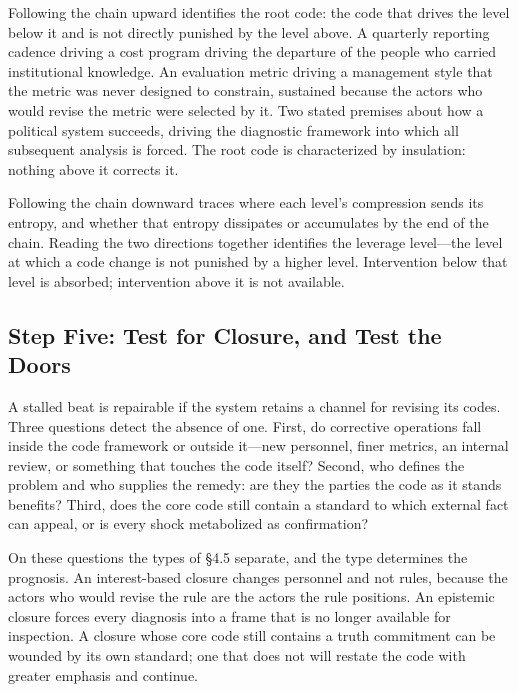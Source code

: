 \documentclass[11pt,a4paper]{article}
\begin{document}
Following the chain upward identifies the root code: the code that drives the level below it and is not directly punished by the level above. A quarterly reporting cadence driving a cost program driving the departure of the people who carried institutional knowledge. An evaluation metric driving a management style that the metric was never designed to constrain, sustained because the actors who would revise the metric were selected by it. Two stated premises about how a political system succeeds, driving the diagnostic framework into which all subsequent analysis is forced. The root code is characterized by insulation: nothing above it corrects it.

Following the chain downward traces where each level's compression sends its entropy, and whether that entropy dissipates or accumulates by the end of the chain. Reading the two directions together identifies the leverage level---the level at which a code change is not punished by a higher level. Intervention below that level is absorbed; intervention above it is not available.

\subsection{Step Five: Test for Closure, and Test the Doors}

A stalled beat is repairable if the system retains a channel for revising its codes. Three questions detect the absence of one. First, do corrective operations fall inside the code framework or outside it---new personnel, finer metrics, an internal review, or something that touches the code itself? Second, who defines the problem and who supplies the remedy: are they the parties the code as it stands benefits? Third, does the core code still contain a standard to which external fact can appeal, or is every shock metabolized as confirmation?

On these questions the types of \S4.5 separate, and the type determines the prognosis. An interest-based closure changes personnel and not rules, because the actors who would revise the rule are the actors the rule positions. An epistemic closure forces every diagnosis into a frame that is no longer available for inspection. A closure whose core code still contains a truth commitment can be wounded by its own standard; one that does not will restate the code with greater emphasis and continue.
\end{document}
